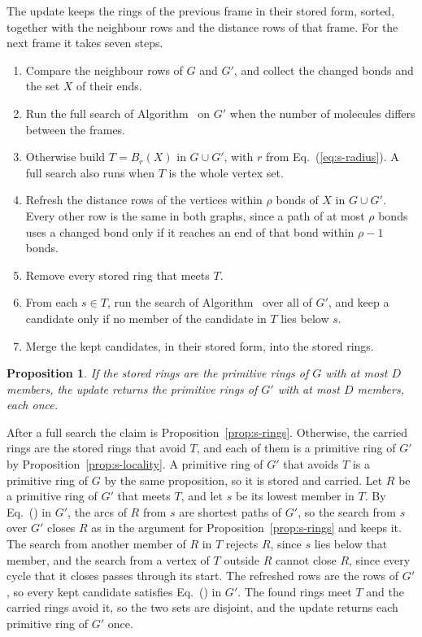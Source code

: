 \documentclass[preprint,12pt]{elsarticle}
\newtheorem{proposition}{Proposition}
\begin{document}
The update keeps the rings of the previous frame in their stored form, sorted, together with the neighbour rows and the distance rows of that frame.
For the next frame it takes seven steps.
\begin{enumerate}
\item Compare the neighbour rows of $G$ and $G'$, and collect the changed bonds and the set $X$ of their ends.
\item Run the full search of Algorithm~ on $G'$ when the number of molecules differs between the frames.
\item Otherwise build $T=B_r(X)$ in $G\cup G'$, with $r$ from Eq.~(\ref{eq:s-radius}).
      A full search also runs when $T$ is the whole vertex set.
\item Refresh the distance rows of the vertices within $\rho$ bonds of $X$ in $G\cup G'$.
      Every other row is the same in both graphs, since a path of at most $\rho$ bonds uses a changed bond only if it reaches an end of that bond within $\rho-1$ bonds.
\item Remove every stored ring that meets $T$.
\item From each $s\in T$, run the search of Algorithm~ over all of $G'$, and keep a candidate only if no member of the candidate in $T$ lies below $s$.
\item Merge the kept candidates, in their stored form, into the stored rings.
\end{enumerate}

\begin{proposition}
\label{prop:s-update} If the stored rings are the primitive rings of $G$ with at most $D$ members, the update returns the primitive rings of $G'$ with at most $D$ members, each once.
\end{proposition}

\begin{pf}
After a full search the claim is Proposition~\ref{prop:s-rings}.
Otherwise, the carried rings are the stored rings that avoid $T$, and each of them is a primitive ring of $G'$ by Proposition~\ref{prop:s-locality}.
A primitive ring of $G'$ that avoids $T$ is a primitive ring of $G$ by the same proposition, so it is stored and carried.
Let $R$ be a primitive ring of $G'$ that meets $T$, and let $s$ be its lowest member in $T$.
By Eq.~() in $G'$, the arcs of $R$ from $s$ are shortest paths of $G'$, so the search from $s$ over $G'$ closes $R$ as in the argument for Proposition~\ref{prop:s-rings} and keeps it.
The search from another member of $R$ in $T$ rejects $R$, since $s$ lies below that member, and the search from a vertex of $T$ outside $R$ cannot close $R$, since every cycle that it closes passes through its start.
The refreshed rows are the rows of $G'$, so every kept candidate satisfies Eq.~() in $G'$.
The found rings meet $T$ and the carried rings avoid it, so the two sets are disjoint, and the update returns each primitive ring of $G'$ once.
\end{pf}
\end{document}
